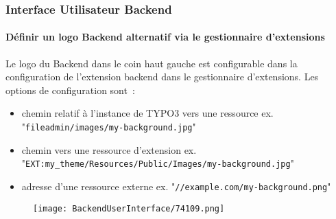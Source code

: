 \begin{frame}[fragile]
	\frametitle{Interface Utilisateur Backend}
	\framesubtitle{Définir un logo Backend alternatif via le gestionnaire d'extensions}

	Le logo du Backend dans le coin haut gauche est configurable dans la configuration
	de l'extension backend dans le gestionnaire d'extensions.\newline
	Les options de configuration sont~:

	\begin{itemize}
		\item chemin relatif à l'instance de TYPO3 vers une ressource\newline
			\smaller
				ex. "\texttt{fileadmin/images/my-background.jpg}"
			\normalsize

		\item chemin vers une ressource d'extension\newline
			\smaller
				ex. "\texttt{EXT:my\_theme/Resources/Public/Images/my-background.jpg}"
			\normalsize

		\item adresse d'une ressource externe\newline
			\smaller
				ex. "\texttt{//example.com/my-background.png}"
			\normalsize

	\end{itemize}

	\begin{figure}
		\texttt{[image: BackendUserInterface/74109.png]}
	\end{figure}

\end{frame}

